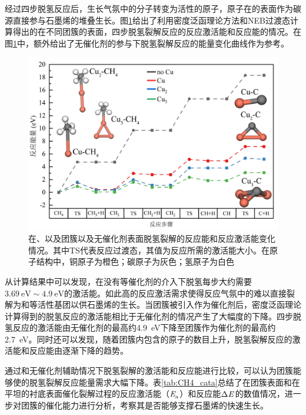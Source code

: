     经过四步脱氢反应后，生长气氛中的分子转变为活性的原子，原子在的表面作为碳源直接参与石墨烯的堆叠生长。图\ref{fig:CG_DFT_CuCHx}给出了利用密度泛函理论方法和NEB过渡态计算得出的在不同团簇的表面，四步脱氢裂解反应的反应激活能和反应能的情况。在图\ref{fig:CG_DFT_CuCHx}中，额外给出了无催化剂的参与下脱氢裂解反应的能量变化曲线作为参考。

    \begin{figure}[htb]
        \includegraphics{pic/CG_DFT_CuCHx.png}
        \caption{在、以及团簇以及无催化剂表面脱氢裂解的反应能和反应激活能变化情况。其中TS代表反应过渡态，其值为反应所需的激活能大小。在原子结构中，铜原子为橙色；碳原子为灰色；氢原子为白色}
        \label{fig:CG_DFT_CuCHx}
    \end{figure}

    从计算结果中可以发现，在没有等催化剂的介入下脱氢每步大约需要$\SI{3.69}{\electronvolt}\sim  \SI{4.9}{\electronvolt}$的激活能。如此高的反应激活需求使得反应气氛中的难以直接裂解为和等活性基团以供石墨烯的生长。当团簇被引入作为催化剂后，密度泛函理论计算得到的脱氢反应的激活能相比于无催化剂的情况产生了大幅度的下降。四步脱氢反应的激活能由无催化剂的最高约\SI{4.9}{\electronvolt}下降至团簇作为催化剂的最高约\SI{2.7}{\electronvolt}。同时还可以发现，随着团簇内包含的原子的数目上升，脱氢裂解反应的激活能和反应能由逐渐下降的趋势。

    通过和无催化剂辅助情况下脱氢裂解的激活能和反应能进行比较，可以认为团簇能够使的脱氢裂解反应能量需求大幅下降。表\ref{tab:CH4_cata}总结了在团簇表面和在平坦的衬底表面催化裂解过程的反应激活能（$\it E_{\rm a}^{\rm } \it$）和反应能$\rm{\Delta} \it \it E_{\rm }^{\rm } \it$的数值情况，进一步对团簇的催化能力进行分析，考察其是否能够支撑石墨烯的快速生长。

